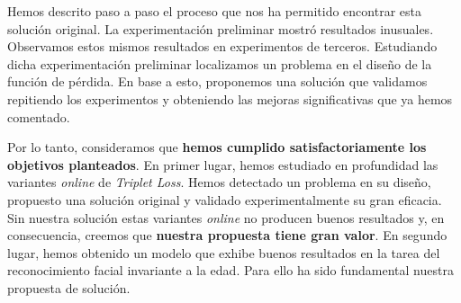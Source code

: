 Hemos descrito paso a paso el proceso que nos ha permitido encontrar esta solución original. La experimentación preliminar mostró resultados inusuales. Observamos estos mismos resultados en experimentos de terceros. Estudiando dicha experimentación preliminar localizamos un problema en el diseño de la función de pérdida. En base a esto, proponemos una solución que validamos repitiendo los experimentos y obteniendo las mejoras significativas que ya hemos comentado.

Por lo tanto, consideramos que \textbf{hemos cumplido satisfactoriamente los objetivos planteados}. En primer lugar, hemos estudiado en profundidad las variantes \textit{online} de \textit{Triplet Loss}. Hemos detectado un problema en su diseño, propuesto una solución original y validado experimentalmente su gran eficacia. Sin nuestra solución estas variantes \textit{online} no producen buenos resultados y, en consecuencia, creemos que \textbf{nuestra propuesta tiene gran valor}. En segundo lugar, hemos obtenido un modelo que exhibe buenos resultados en la tarea del reconocimiento facial invariante a la edad. Para ello ha sido fundamental nuestra propuesta de solución.

\endinput
